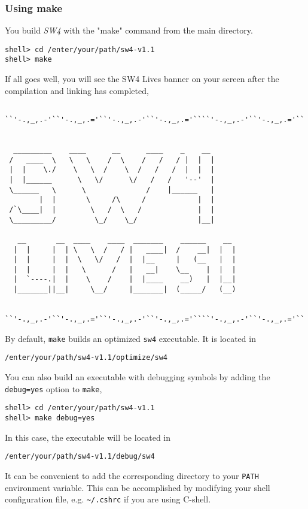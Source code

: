 \documentclass[11pt]{article}
\begin{document}
\subsubsection{Using make}
You build \emph{SW4} with the "make" command from the main directory.
\begin{verbatim}
shell> cd /enter/your/path/sw4-v1.1
shell> make
\end{verbatim}
If all goes well, you will see the SW4 Lives banner on your screen after the compilation and linking
has completed,
{\samepage
\begin{verbatim}

``'-.,_,.-'``'-.,_,.='``'-.,_,.-'``'-.,_,.='````'-.,_,.-'``'-.,_,.='``


  _________    ____      __      ____    _    __
 /   ____  \   \   \    /  \    /   /   / |  |  |
 |  |    \./    \   \  /    \  /   /   /  |  |  |
 |  |______      \   \/      \/   /   /   '--'  |
 \______   \      \              /    |______   |
        |  |       \     /\     /            |  |
 /`\____|  |        \   /  \   /             |  |
 \_________/         \_/    \_/              |__|

   __       __  ____    ____  _______    ______    __
  |  |     |  | \   \  /   / |   ____|  /    __|  |  |
  |  |     |  |  \   \/   /  |  |__     |   (__   |  |
  |  |     |  |   \      /   |   __|    \__    |  |  |
  |  `----.|  |    \    /    |  |____    __)   |  |__|
  |_______||__|     \__/     |_______|  (_____/   (__)


``'-.,_,.-'``'-.,_,.='``'-.,_,.-'``'-.,_,.='````'-.,_,.-'``'-.,_,.='``

\end{verbatim}
}
By default, \verb+make+ builds an optimized \verb+sw4+ executable. It is located in
\begin{verbatim}
/enter/your/path/sw4-v1.1/optimize/sw4
\end{verbatim}
You can also build an executable with debugging symbols by adding the \verb+debug=yes+ option to \verb+make+,
\begin{verbatim}
shell> cd /enter/your/path/sw4-v1.1
shell> make debug=yes
\end{verbatim}
In this case, the executable will be located in
\begin{verbatim}
/enter/your/path/sw4-v1.1/debug/sw4
\end{verbatim}
It can be convenient to add the corresponding directory to your \verb+PATH+ environment
variable. This can be accomplished by modifying your shell configuration file, e.g. \verb+~/.cshrc+
if you are using C-shell.
\end{document}
